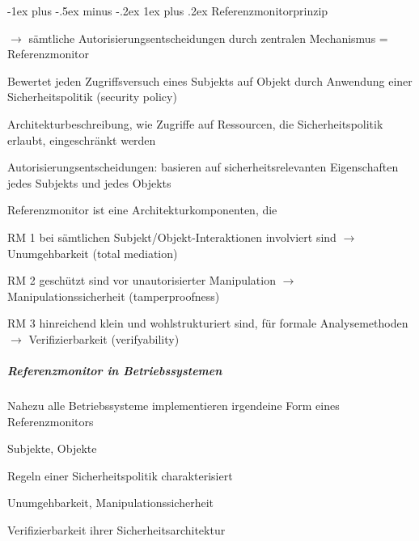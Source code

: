 \documentclass[a4paper]{article}
\makeatletter
\renewcommand{\subsubsection}{\@startsection{subsubsection}{3}{0mm}%
 {-1ex plus -.5ex minus -.2ex}%
 {1ex plus .2ex}%
 {\normalfont\small\bfseries}}
\makeatother
\begin{document}
\begin{multicols}{3}
    \subsubsection{Referenzmonitorprinzip}
    \begin{itemize*}
        \item[$\rightarrow$] sämtliche Autorisierungsentscheidungen durch zentralen Mechanismus = Referenzmonitor
        \item Bewertet jeden Zugriffsversuch eines Subjekts auf Objekt durch Anwendung einer Sicherheitspolitik (security policy)
        \item Architekturbeschreibung, wie Zugriffe auf Ressourcen, die Sicherheitspolitik erlaubt, eingeschränkt werden
        \item Autorisierungsentscheidungen: basieren auf sicherheitsrelevanten Eigenschaften jedes Subjekts und jedes Objekts
    \end{itemize*}

    Referenzmonitor ist eine Architekturkomponenten, die
    \begin{description*}
        \item[RM 1] bei sämtlichen Subjekt/Objekt-Interaktionen involviert sind $\rightarrow$ Unumgehbarkeit (total mediation)
        \item[RM 2] geschützt sind vor unautorisierter Manipulation $\rightarrow$ Manipulationssicherheit (tamperproofness)
        \item[RM 3] hinreichend klein und wohlstrukturiert sind, für formale Analysemethoden $\rightarrow$ Verifizierbarkeit (verifyability)
    \end{description*}

    \subparagraph{Referenzmonitor in Betriebssystemen}
    Nahezu alle Betriebssysteme implementieren irgendeine Form eines Referenzmonitors
    \begin{itemize*}
        \item Subjekte, Objekte
        \item Regeln einer Sicherheitspolitik charakterisiert
        \item Unumgehbarkeit, Manipulationssicherheit
        \item Verifizierbarkeit ihrer Sicherheitsarchitektur
    \end{itemize*}


\end{multicols}
\end{document}
